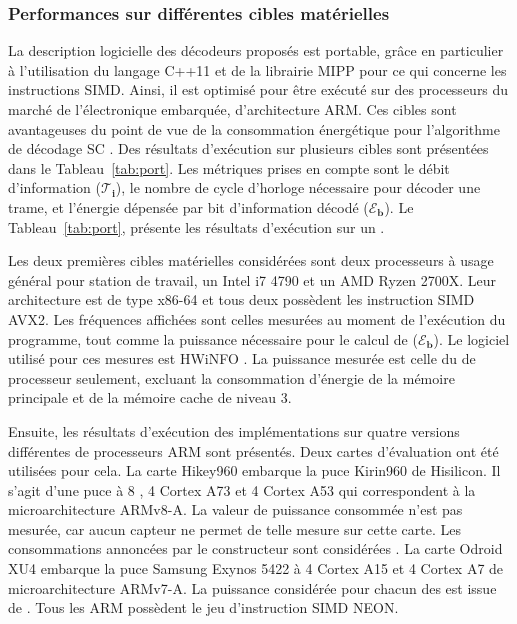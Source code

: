 \subsubsection{Performances sur différentes cibles matérielles}

La description logicielle des décodeurs proposés est portable, grâce en particulier à l'utilisation du langage C++11 et de la librairie MIPP \cite{cassagne2018mipp} pour ce qui concerne les instructions SIMD. Ainsi, il est optimisé pour être exécuté sur des processeurs du marché de l'électronique embarquée, d'architecture ARM. Ces cibles sont avantageuses du point de vue de la consommation énergétique pour l'algorithme de décodage SC \cite{cassagne_energy_2016}. Des résultats d'exécution sur plusieurs cibles sont présentées dans le Tableau~\ref{tab:port}. Les métriques prises en compte sont le débit d'information ($\bm{\mathcal{T}_i}$), le nombre de cycle d'horloge nécessaire pour décoder une trame, et l'énergie dépensée par bit d'information décodé ($\bm{\mathcal{E}_b}$). Le Tableau~\ref{tab:port}, présente les résultats d'exécution sur un \coeur.

Les deux premières cibles matérielles considérées sont deux processeurs à usage général pour station de travail, un Intel i7 4790 et un AMD Ryzen 2700X. Leur architecture est de type x86-64 et tous deux possèdent les instruction SIMD AVX2. Les fréquences affichées sont celles mesurées au moment de l'exécution du programme, tout comme la puissance nécessaire pour le calcul de ($\bm{\mathcal{E}_b}$). Le logiciel utilisé pour ces mesures est HWiNFO \cite{noauthor_hwinfo_nodate}. La puissance mesurée est celle du \coeur de processeur seulement, excluant la consommation d'énergie de la mémoire principale et de la mémoire cache de niveau 3.

Ensuite, les résultats d'exécution des implémentations sur quatre versions différentes de processeurs ARM sont présentés. Deux cartes d'évaluation ont été utilisées pour cela. La carte Hikey960 embarque la puce Kirin960 de Hisilicon. Il s'agit d'une puce à 8 \coeurs, 4 Cortex A73 et 4 Cortex A53 qui correspondent à la microarchitecture ARMv8-A. La valeur de puissance consommée n'est pas mesurée, car aucun capteur ne permet de telle mesure sur cette carte. Les consommations annoncées par le constructeur sont considérées \cite{humrick_hisilicon_nodate}. La carte Odroid XU4 embarque la puce Samsung Exynos 5422 à 4 \coeurs Cortex A15 et 4 \coeurs Cortex A7 de microarchitecture ARMv7-A. La puissance considérée pour chacun des \coeurs est issue de \cite{holmgren_energy_nodate,benmoussa_performance_nodate}. Tous les \coeurs ARM possèdent le jeu d'instruction SIMD NEON.

